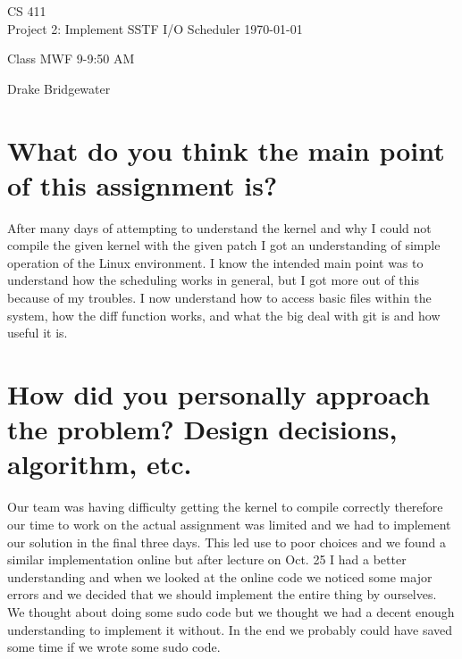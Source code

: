 \documentclass[letterpaper,10pt]{article}
\begin{document}
\begin{titlepage}
	\vspace*{4cm}
	\begin{flushright}
	{\huge
		CS 411 \\[1cm]
	}
	{\large
		Project 2: Implement SSTF I/O Scheduler
	}
	\today
	\end{flushright}
	\begin{flushleft}
		Class MWF 9-9:50 AM
	\end{flushleft}
	\begin{flushright}
		Drake Bridgewater
	\vfill
	\end{flushright}
\end{titlepage}


\tableofcontents


\newpage

\section{What do you think the main point of this assignment is?} 
After many days of attempting to understand the kernel and why I could not compile the given kernel with the given patch I got an understanding of simple operation of the Linux environment. I know the intended main point was to understand how the scheduling works in general, but I got more out of this because of my troubles. I now understand how to access basic files within the system, how the diff function works, and what the big deal with git is and how useful it is.
\section{How did you personally approach the problem? Design decisions, algorithm, etc.}
Our team was having difficulty getting the kernel to compile correctly therefore our time to work on the actual assignment was limited and we had to implement our solution in the final three days. This led use to poor choices and we found a similar implementation online but after lecture on Oct. 25 I had a better understanding and when we looked at the online code we noticed some major errors and we decided that we should implement the entire thing by ourselves. We thought about doing some sudo code but we thought we had a decent enough understanding to implement it without. In the end we probably could have saved some time if we wrote some sudo code.
\end{document}
